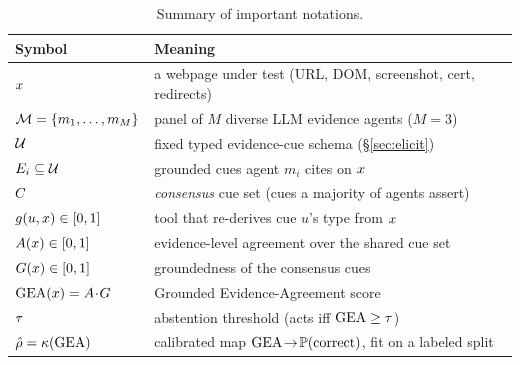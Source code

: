 \begin{table}[!h]
\caption{Summary of important notations.}
\label{tab:notation}
\footnotesize
\setlength{\tabcolsep}{4pt}
\begin{tabularx}{\columnwidth}{l >{\raggedright\arraybackslash}X}
\toprule
Symbol & Meaning \\
\midrule
$x$                 & a webpage under test (URL, DOM, screenshot, cert, redirects) \\
$\mathcal{M}=\{m_1,\dots,m_M\}$ & panel of $M$ diverse LLM evidence agents ($M{=}3$) \\
$\mathcal{U}$              & fixed typed evidence-cue schema (\S\ref{sec:elicit}) \\
$E_i\subseteq\mathcal{U}$ & grounded cues agent $m_i$ cites on $x$ \\
$C$                 & \emph{consensus} cue set (cues a majority of agents assert) \\
$g(u,x)\in[0,1]$ & tool that re-derives cue $u$'s type from $x$ \\
$A(x)\in[0,1]$   & evidence-level agreement over the shared cue set \\
$G(x)\in[0,1]$   & groundedness of the consensus cues \\
$\mathrm{GEA}(x)=A\!\cdot\!G$ & Grounded Evidence-Agreement score \\
$\tau$                  & abstention threshold (acts iff $\mathrm{GEA}\ge\tau$) \\
$\hat\rho=\kappa(\mathrm{GEA})$ & calibrated map $\mathrm{GEA}\!\to\!\mathbb{P}(\text{correct})$, fit on a labeled split \\
\bottomrule
\end{tabularx}
\end{table}
